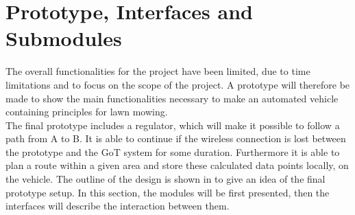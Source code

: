 \section{Prototype, Interfaces and Submodules}





The overall functionalities for the project have been limited, due to time limitations and to focus on the scope of the project. A prototype will therefore be made to show the main functionalities necessary to make an automated vehicle containing principles for lawn mowing.\\
The final prototype includes a regulator, which will make it possible to follow a path from A to B. It is able to continue if the wireless connection is lost between the prototype and the GoT system for some duration. Furthermore it is able to plan a route within a given area and store these calculated data points locally, on the vehicle. The outline of the design is shown in  to give an idea of the final prototype setup. In this section, the modules will be first presented, then the interfaces will describe the interaction between them.

